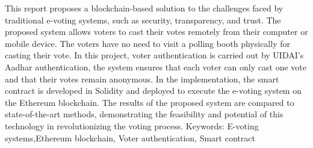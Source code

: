 \begin{Abstract}
This report proposes a blockchain-based solution to the challenges faced by traditional e-voting systems, such as security, transparency, and trust. The proposed system allows voters to cast their votes remotely from their computer or mobile device. The voters have no need to visit a polling booth physically for casting their vote. In this project, voter authentication is carried out by UIDAI's Aadhar authentication, the system ensures that each voter can only cast one vote and that their votes remain anonymous. In the implementation, the smart contract is developed in Solidity and deployed to execute the e-voting system on the Ethereum blockchain. The results of the proposed system are compared to state-of-the-art methods, demonstrating the feasibility and potential of this technology in revolutionizing the voting process. 
\noindent Keywords: E-voting systems,Ethereum blockchain, Voter authentication, Smart contract
%
%
%
%
%
\end{Abstract}

